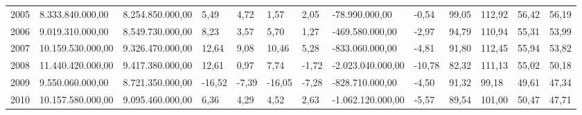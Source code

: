 \documentclass[a4paper,openright,12pt]{book}
\begin{document}
\begin{table}
{\begin{tabular}{lllllllllllll}
    2005 &                      8.333.840.000,00 &                      8.254.850.000,00 &                                          5,49 &                                          4,72 &                                       1,57 &                                       2,05 &         -78.990.000,00 &                    -0,54 &                  99,05 &                112,92 &                                 56,42 &                   56,19 \\
    2006 &                      9.019.310.000,00 &                      8.549.730.000,00 &                                          8,23 &                                          3,57 &                                       5,70 &                                       1,27 &        -469.580.000,00 &                    -2,97 &                  94,79 &                110,94 &                                 55,31 &                   53,99 \\
    2007 &                     10.159.530.000,00 &                      9.326.470.000,00 &                                         12,64 &                                          9,08 &                                      10,46 &                                       5,28 &        -833.060.000,00 &                    -4,81 &                  91,80 &                112,45 &                                 55,94 &                   53,82 \\
    2008 &                     11.440.420.000,00 &                      9.417.380.000,00 &                                         12,61 &                                          0,97 &                                       7,74 &                                      -1,72 &      -2.023.040.000,00 &                   -10,78 &                  82,32 &                111,13 &                                 55,02 &                   50,18 \\
    2009 &                      9.550.060.000,00 &                      8.721.350.000,00 &                                        -16,52 &                                         -7,39 &                                     -16,05 &                                      -7,28 &        -828.710.000,00 &                    -4,50 &                  91,32 &                 99,18 &                                 49,61 &                   47,34 \\
    2010 &                     10.157.580.000,00 &                      9.095.460.000,00 &                                          6,36 &                                          4,29 &                                       4,52 &                                       2,63 &      -1.062.120.000,00 &                    -5,57 &                  89,54 &                101,00 &                                 50,47 &                   47,71 \\

\end{tabular}}
\end{table}
\end{document}
